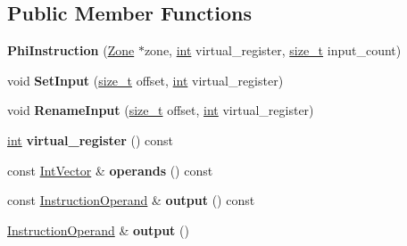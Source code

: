 \subsection*{Public Member Functions}
\begin{DoxyCompactItemize}
\item 
\mbox{\label{classv8_1_1internal_1_1compiler_1_1PhiInstruction_a913a59d9a1a1a99aa901a6fb66afb66d}} 
{\bfseries Phi\+Instruction} (\mbox{\hyperlink{classv8_1_1internal_1_1Zone}{Zone}} $\ast$zone, \mbox{\hyperlink{classint}{int}} virtual\+\_\+register, \mbox{\hyperlink{classsize__t}{size\+\_\+t}} input\+\_\+count)
\item 
\mbox{\label{classv8_1_1internal_1_1compiler_1_1PhiInstruction_aa1c3ab51327ba7b508b7e9bd082cf633}} 
void {\bfseries Set\+Input} (\mbox{\hyperlink{classsize__t}{size\+\_\+t}} offset, \mbox{\hyperlink{classint}{int}} virtual\+\_\+register)
\item 
\mbox{\label{classv8_1_1internal_1_1compiler_1_1PhiInstruction_a11e9bd1cde962ad19651090e8e0309f4}} 
void {\bfseries Rename\+Input} (\mbox{\hyperlink{classsize__t}{size\+\_\+t}} offset, \mbox{\hyperlink{classint}{int}} virtual\+\_\+register)
\item 
\mbox{\label{classv8_1_1internal_1_1compiler_1_1PhiInstruction_a6abf9a978efb0d4f40c1ecf15ef125f2}} 
\mbox{\hyperlink{classint}{int}} {\bfseries virtual\+\_\+register} () const
\item 
\mbox{\label{classv8_1_1internal_1_1compiler_1_1PhiInstruction_a75827c26759f0593652e04fdffb6d69d}} 
const \mbox{\hyperlink{classv8_1_1internal_1_1ZoneVector}{Int\+Vector}} \& {\bfseries operands} () const
\item 
\mbox{\label{classv8_1_1internal_1_1compiler_1_1PhiInstruction_a48f8de671c2f0d3ba337a8807051cf55}} 
const \mbox{\hyperlink{classv8_1_1internal_1_1compiler_1_1InstructionOperand}{Instruction\+Operand}} \& {\bfseries output} () const
\item 
\mbox{\label{classv8_1_1internal_1_1compiler_1_1PhiInstruction_a871b32649094231f1491d8a41da377c4}} 
\mbox{\hyperlink{classv8_1_1internal_1_1compiler_1_1InstructionOperand}{Instruction\+Operand}} \& {\bfseries output} ()
\end{DoxyCompactItemize}



